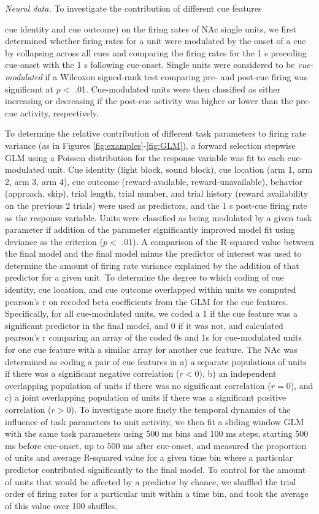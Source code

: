 \documentclass[11pt]{article}
\begin{document}
{\it Neural data.} To investigate the contribution of different cue
features {cue identity and cue outcome) on the firing rates of NAc
single units, we first determined whether firing rates for a unit
were modulated by the onset of a cue by collapsing across all cues
and comparing the firing rates for the 1 s preceding cue-onset with
the 1 s following cue-onset. Single units were considered to be {\it
cue-modulated} if a Wilcoxon signed-rank test comparing pre- and
post-cue firing was significant at $p <$ .01. Cue-modulated units
were then classified as either increasing or decreasing if the
post-cue activity was higher or lower than the pre-cue activity,
respectively.

To determine the relative contribution of different task parameters to firing rate variance (as in Figures \ref{fig:examples}-\ref{fig:GLM}), a forward selection stepwise GLM using a Poisson distribution for the response variable was fit to each cue-modulated unit. Cue identity (light block, sound block), cue location (arm 1, arm 2, arm 3, arm 4), cue outcome (reward-available, reward-unavailable), behavior (approach, skip), trial length, trial number, and trial history (reward availability on the previous 2 trials) were used as predictors, and the 1 s post-cue firing rate as the response variable. Units were classified as being modulated by a
given task parameter if addition of the parameter significantly improved model fit using deviance as the criterion ($p <$ .01). A comparison of the R-squared value between the final model and the final model minus the predictor of interest was used to determine the amount of firing rate variance explained by the addition of that predictor for a given unit. To determine the degree to which coding of cue identity, cue location, and cue outcome overlapped within units we computed pearson’s r on recoded beta coefficients from the GLM for the cue features. Specifically, for all cue-modulated units, we coded a 1 if the cue feature was a significant predictor in the final model, and 0 if it was not, and calculated pearson’s r comparing an array of the coded 0s and 1s for cue-modulated units for one cue feature with a similar array for another cue feature. The NAc was determined as coding a pair of cue features in a) a separate populations of units if there was a significant negative correlation ($r < $0), b) an independent overlapping population of units if there was no significant correlation ($r = $0), and c) a joint overlapping population of units if there was a significant positive correlation ($r > $0). To investigate more finely the temporal dynamics of the influence of task parameters to unit activity, we then fit a sliding window GLM with the same task parameters using 500 ms bins and 100 ms steps, starting 500 ms before cue-onset, up to 500 ms after cue-onset, and measured the proportion of units and average R-squared value for a given time bin where a particular predictor contributed significantly to the final model. To control for the amount of units that would be affected by a predictor by chance, we shuffled the trial order of firing rates for a particular unit within a time bin, and took the average of this value over 100 shuffles.

}
\end{document}
